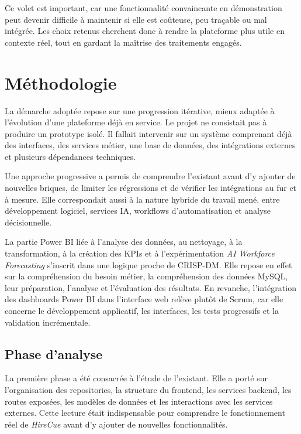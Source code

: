 Ce volet est important, car une fonctionnalité convaincante en démonstration peut devenir difficile à maintenir si elle est coûteuse, peu traçable ou mal intégrée. Les choix retenus cherchent donc à rendre la plateforme plus utile en contexte réel, tout en gardant la maîtrise des traitements engagés.

\section{Méthodologie}

La démarche adoptée repose sur une progression itérative, mieux adaptée à l'évolution d'une plateforme déjà en service. Le projet ne consistait pas à produire un prototype isolé. Il fallait intervenir sur un système comprenant déjà des interfaces, des services métier, une base de données, des intégrations externes et plusieurs dépendances techniques.

Une approche progressive a permis de comprendre l'existant avant d'y ajouter de nouvelles briques, de limiter les régressions et de vérifier les intégrations au fur et à mesure. Elle correspondait aussi à la nature hybride du travail mené, entre développement logiciel, services IA, workflows d'automatisation et analyse décisionnelle.

La partie Power BI liée à l'analyse des données, au nettoyage, à la transformation, à la création des KPIs et à l'expérimentation \textit{AI Workforce Forecasting} s'inscrit dans une logique proche de CRISP-DM. Elle repose en effet sur la compréhension du besoin métier, la compréhension des données MySQL, leur préparation, l'analyse et l'évaluation des résultats. En revanche, l'intégration des dashboards Power BI dans l'interface web relève plutôt de Scrum, car elle concerne le développement applicatif, les interfaces, les tests progressifs et la validation incrémentale.

\subsection{Phase d'analyse}

La première phase a été consacrée à l'étude de l'existant. Elle a porté sur l'organisation des repositories, la structure du frontend, les services backend, les routes exposées, les modèles de données et les interactions avec les services externes. Cette lecture était indispensable pour comprendre le fonctionnement réel de \textit{HireCue} avant d'y ajouter de nouvelles fonctionnalités.

